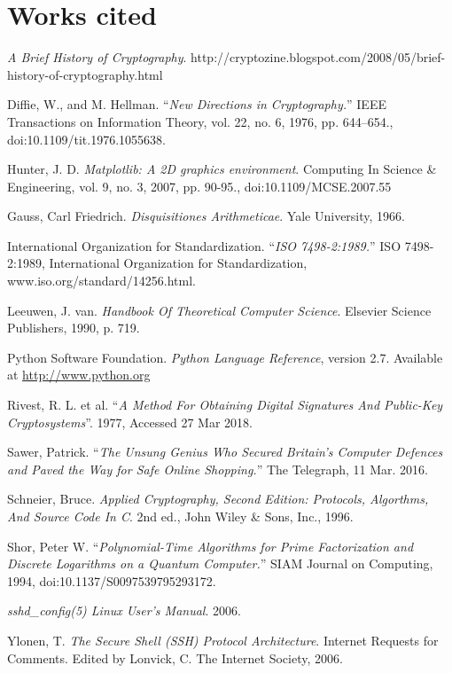 \documentclass[a4paper, 10pt]{article}
\begin{document}
\section*{Works cited}
\begin{hangparas}{.25in}{1}
\textit{A Brief History of Cryptography}. http://cryptozine.blogspot.com/2008/05/brief-history-of-cryptography.html

Diffie, W., and M. Hellman. ``\textit{New Directions in Cryptography.}'' IEEE Transactions on Information Theory, vol. 22, no. 6, 1976, pp. 644–654., doi:10.1109/tit.1976.1055638.

Hunter, J. D. \textit{Matplotlib: A 2D graphics environment}. Computing In Science \& Engineering, vol. 9, no. 3, 2007, pp. 90-95., doi:10.1109/MCSE.2007.55

Gauss, Carl Friedrich. \textit{Disquisitiones Arithmeticae}. Yale University, 1966.

International Organization for Standardization. ``\textit{ISO 7498-2:1989.}'' ISO 7498-2:1989, International Organization for Standardization, www.iso.org/standard/14256.html.

Leeuwen, J. van. \textit{Handbook Of Theoretical Computer Science}. Elsevier Science Publishers, 1990, p. 719.

Python Software Foundation. \textit{Python Language Reference}, version 2.7. Available at \url{http://www.python.org}

Rivest, R. L. et al. ``\textit{A Method For Obtaining Digital Signatures And Public-Key Cryptosystems}''. 1977, Accessed 27 Mar 2018.

Sawer, Patrick. ``\textit{The Unsung Genius Who Secured Britain's Computer Defences and Paved the Way for Safe Online Shopping.}'' The Telegraph, 11 Mar. 2016.

Schneier, Bruce. \textit{Applied Cryptography, Second Edition: Protocols, Algorthms, And Source Code In C}. 2nd ed., John Wiley \& Sons, Inc., 1996.

Shor, Peter W. ``\textit{Polynomial-Time Algorithms for Prime Factorization and Discrete Logarithms on a Quantum Computer.}'' SIAM Journal on Computing, 1994, doi:10.1137/S0097539795293172.

\textit{sshd\_config(5) Linux User's Manual}. 2006.

Ylonen, T. \textit{The Secure Shell (SSH) Protocol Architecture}. Internet Requests for Comments. Edited by Lonvick, C. The Internet Society, 2006.
\end{hangparas}
\end{document}
